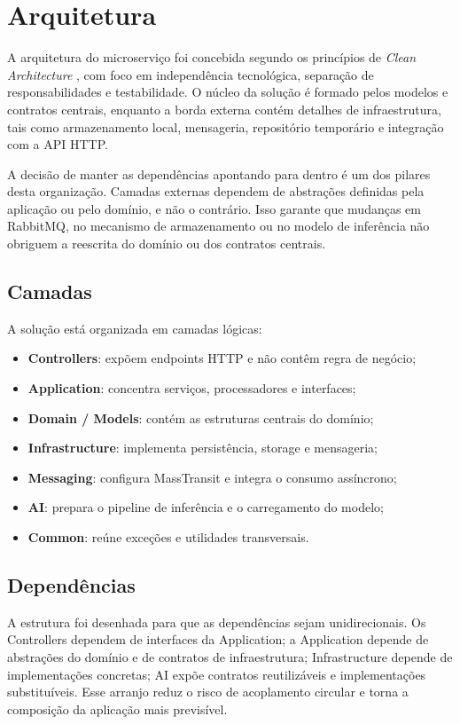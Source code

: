 \chapter{Arquitetura}

A arquitetura do microserviço foi concebida segundo os princípios de \textit{Clean Architecture} \cite{martin2008clean}, com foco em independência tecnológica, separação de responsabilidades e testabilidade. O núcleo da solução é formado pelos modelos e contratos centrais, enquanto a borda externa contém detalhes de infraestrutura, tais como armazenamento local, mensageria, repositório temporário e integração com a API HTTP.

A decisão de manter as dependências apontando para dentro é um dos pilares desta organização. Camadas externas dependem de abstrações definidas pela aplicação ou pelo domínio, e não o contrário. Isso garante que mudanças em RabbitMQ, no mecanismo de armazenamento ou no modelo de inferência não obriguem a reescrita do domínio ou dos contratos centrais.

\section{Camadas}

A solução está organizada em camadas lógicas:
\begin{itemize}
    \item \textbf{Controllers}: expõem endpoints HTTP e não contêm regra de negócio;
    \item \textbf{Application}: concentra serviços, processadores e interfaces;
    \item \textbf{Domain / Models}: contém as estruturas centrais do domínio;
    \item \textbf{Infrastructure}: implementa persistência, storage e mensageria;
    \item \textbf{Messaging}: configura MassTransit e integra o consumo assíncrono;
    \item \textbf{AI}: prepara o pipeline de inferência e o carregamento do modelo;
    \item \textbf{Common}: reúne exceções e utilidades transversais.
\end{itemize}

\section{Dependências}

A estrutura foi desenhada para que as dependências sejam unidirecionais. Os Controllers dependem de interfaces da Application; a Application depende de abstrações do domínio e de contratos de infraestrutura; Infrastructure depende de implementações concretas; AI expõe contratos reutilizáveis e implementações substituíveis. Esse arranjo reduz o risco de acoplamento circular e torna a composição da aplicação mais previsível.

